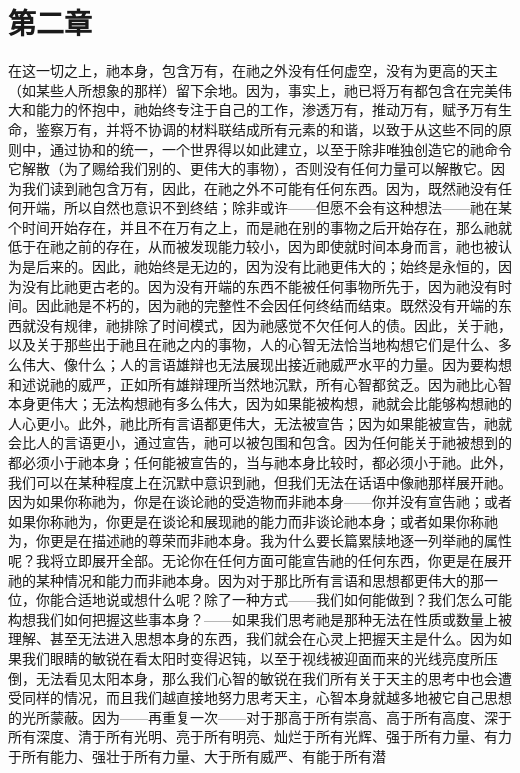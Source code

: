 
\section{第二章}

\par

在这一切之上，祂本身，包含万有，在祂之外没有任何虚空，没有为更高的天主（如某些人所想象的那样）留下余地。因为，事实上，祂已将万有都包含在完美伟大和能力的怀抱中，祂始终专注于自己的工作，渗透万有，推动万有，赋予万有生命，鉴察万有，并将不协调的材料联结成所有元素的和谐，以致于从这些不同的原则中，通过协和的统一，一个世界得以如此建立，以至于除非唯独创造它的祂命令它解散（为了赐给我们别的、更伟大的事物），否则没有任何力量可以解散它。因为我们读到祂包含万有，因此，在祂之外不可能有任何东西。因为，既然祂没有任何开端，所以自然也意识不到终结；除非或许——但愿不会有这种想法——祂在某个时间开始存在，并且不在万有之上，而是祂在别的事物之后开始存在，那么祂就低于在祂之前的存在，从而被发现能力较小，因为即使就时间本身而言，祂也被认为是后来的。因此，祂始终是无边的，因为没有比祂更伟大的；始终是永恒的，因为没有比祂更古老的。因为没有开端的东西不能被任何事物所先于，因为祂没有时间。因此祂是不朽的，因为祂的完整性不会因任何终结而结束。既然没有开端的东西就没有规律，祂排除了时间模式，因为祂感觉不欠任何人的债。因此，关于祂，以及关于那些出于祂且在祂之内的事物，人的心智无法恰当地构想它们是什么、多么伟大、像什么；人的言语雄辩也无法展现出接近祂威严水平的力量。因为要构想和述说祂的威严，正如所有雄辩理所当然地沉默，所有心智都贫乏。因为祂比心智本身更伟大；无法构想祂有多么伟大，因为如果能被构想，祂就会比能够构想祂的人心更小。此外，祂比所有言语都更伟大，无法被宣告；因为如果能被宣告，祂就会比人的言语更小，通过宣告，祂可以被包围和包含。因为任何能关于祂被想到的都必须小于祂本身；任何能被宣告的，当与祂本身比较时，都必须小于祂。此外，我们可以在某种程度上在沉默中意识到祂，但我们无法在话语中像祂那样展开祂。因为如果你称祂为，你是在谈论祂的受造物而非祂本身——你并没有宣告祂；或者如果你称祂为，你更是在谈论和展现祂的能力而非谈论祂本身；或者如果你称祂为，你更是在描述祂的尊荣而非祂本身。我为什么要长篇累牍地逐一列举祂的属性呢？我将立即展开全部。无论你在任何方面可能宣告祂的任何东西，你更是在展开祂的某种情况和能力而非祂本身。因为对于那比所有言语和思想都更伟大的那一位，你能合适地说或想什么呢？除了一种方式——我们如何能做到？我们怎么可能构想我们如何把握这些事本身？——如果我们思考祂是那种无法在性质或数量上被理解、甚至无法进入思想本身的东西，我们就会在心灵上把握天主是什么。因为如果我们眼睛的敏锐在看太阳时变得迟钝，以至于视线被迎面而来的光线亮度所压倒，无法看见太阳本身，那么我们心智的敏锐在我们所有关于天主的思考中也会遭受同样的情况，而且我们越直接地努力思考天主，心智本身就越多地被它自己思想的光所蒙蔽。因为——再重复一次——对于那高于所有崇高、高于所有高度、深于所有深度、清于所有光明、亮于所有明亮、灿烂于所有光辉、强于所有力量、有力于所有能力、强壮于所有力量、大于所有威严、有能于所有潜